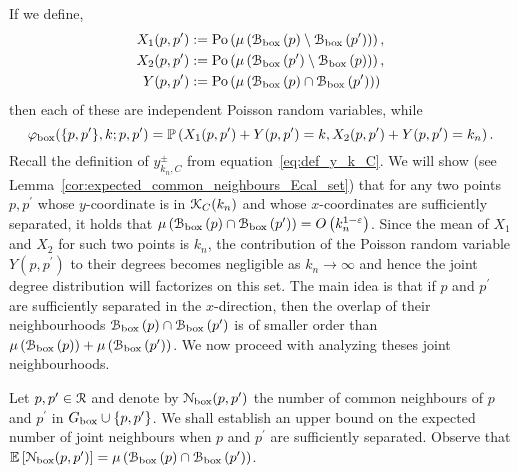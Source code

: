 If we define,
\begin{align*}
	X_1(p,p^\prime) &:= {\mathrm{Po}}\left(\mu\left({\mathcal B}_{\text{box}}\left(p\right)\setminus {\mathcal B}_{\text{box}}\left(p^\prime\right)\right)\right),\\
	X_2(p,p^\prime) &:= {\mathrm{Po}}\left(\mu\left({\mathcal B}_{\text{box}}\left(p^\prime\right)\setminus {\mathcal B}_{\text{box}}\left(p\right)\right)\right),\\
	Y(p,p^\prime) &:= {\mathrm{Po}}\left(\mu\left({\mathcal B}_{\text{box}}\left(p\right) \cap {\mathcal B}_{\text{box}}\left(p^\prime\right)\right)\right)
\end{align*}
then each of these are independent Poisson random variables, while
\[
	\varphi_{\mathrm{box}}(\{p,p^\prime\}, k ;p,p^\prime) 
	= \mathbb{P}\left(X_1(p,p^\prime) + Y(p,p^\prime) = k, X_2(p,p^\prime) + Y(p,p^\prime) = k_n\right).
\]
Recall the definition of $y_{k_n,C}^\pm$ from equation~\eqref{eq:def_y_k_C}. We will show (see Lemma~\ref{cor:expected_common_neighbours_Ecal_set}) that for any two points $p, p^\prime$ whose $y$-coordinate is in ${\mathcal K}_C(k_n)$ and whose $x$-coordinates are sufficiently separated, it holds that $\mu\left({\mathcal B}_{\text{box}}\left(p\right) \cap {\mathcal B}_{\text{box}}\left(p^\prime\right)\right) = O\left(k_n^{1-\varepsilon}\right)$. Since the mean of $X_1$ and $X_2$ for such two points is $k_n$, the contribution of the Poisson random variable $Y(p,p^\prime)$ to their degrees becomes negligible as $k_n \to \infty$ and hence the joint degree distribution will factorizes on this set. The main idea is that if $p$ and $p^\prime$ are sufficiently separated in the $x$-direction, then the overlap of their neighbourhoods ${\mathcal B}_{\text{box}}\left(p\right) \cap {\mathcal B}_{\text{box}}\left(p^\prime\right)$ is of smaller order than $\mu\left({\mathcal B}_{\text{box}}\left(p\right)\right) + \mu\left({\mathcal B}_{\text{box}}\left(p^\prime\right)\right)$. We now proceed with analyzing theses joint neighbourhoods.

Let $p, p^\prime \in {\mathcal R}$ and denote by ${\mathcal N}_{\text{box}}(p,p^\prime)$ the number of common neighbours of $p$ and $p^\prime$ in $G_{\mathrm{box}} \cup \{p,p^\prime\}$. We shall establish an upper bound on the expected number of joint neighbours when $p$ and $p^\prime$ are sufficiently separated. Observe that $\mathbb{E}\left[{\mathcal N}_{\text{box}}(p,p^\prime)\right] = \mu\left({\mathcal B}_{\text{box}}\left(p\right) \cap {\mathcal B}_{\text{box}}\left(p^\prime\right)\right)$. 


